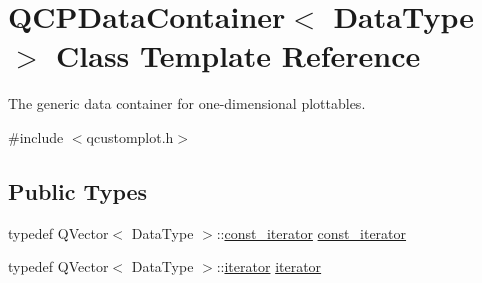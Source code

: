 \hypertarget{class_q_c_p_data_container}{}\section{Q\+C\+P\+Data\+Container$<$ Data\+Type $>$ Class Template Reference}
\label{class_q_c_p_data_container}


The generic data container for one-\/dimensional plottables.  




{\ttfamily \#include $<$qcustomplot.\+h$>$}

\subsection*{Public Types}
\begin{DoxyCompactItemize}
\item 
typedef Q\+Vector$<$ Data\+Type $>$\+::\hyperlink{class_q_c_p_data_container_ae40a91f5cb0bcac61d727427449b7d15}{const\+\_\+iterator} \hyperlink{class_q_c_p_data_container_ae40a91f5cb0bcac61d727427449b7d15}{const\+\_\+iterator}
\item 
typedef Q\+Vector$<$ Data\+Type $>$\+::\hyperlink{class_q_c_p_data_container_a1bb453c3ae37d1ee5268878acb3a9d29}{iterator} \hyperlink{class_q_c_p_data_container_a1bb453c3ae37d1ee5268878acb3a9d29}{iterator}
\end{DoxyCompactItemize}

